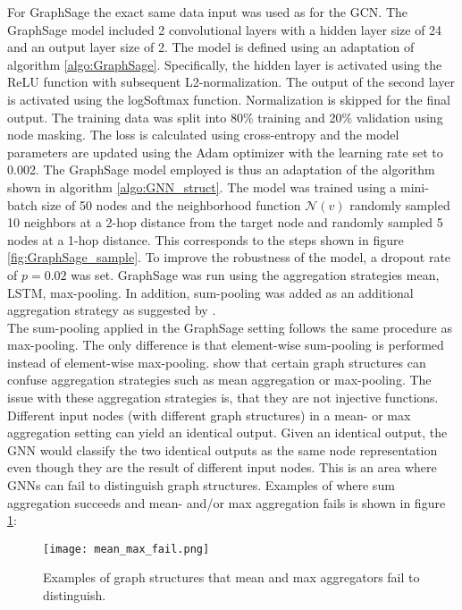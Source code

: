   For GraphSage the exact same data input was used as for the GCN. The 
  GraphSage model included 2 convolutional layers with a hidden layer size of
  24 and an output layer size of 2. The model is defined using an adaptation of 
  algorithm \ref{algo:GraphSage}. Specifically, the hidden layer is activated 
  using the ReLU function with subsequent L2-normalization. The output of the 
  second layer is activated using the logSoftmax function. Normalization is 
  skipped for the final output. The training data was split into 80\% training 
  and 20\% validation using node masking. The loss is calculated using 
  cross-entropy and the model parameters are updated using the Adam optimizer 
  with the learning rate set to 0.002. The GraphSage model employed is thus an
  adaptation of the algorithm shown in algorithm \ref{algo:GNN_struct}. The 
  model was trained using a mini-batch size of 50 nodes and the neighborhood 
  function $\mathcal{N}(v)$ randomly sampled 10 neighbors at a 2-hop distance
  from the target node and randomly sampled 5 nodes at a 1-hop distance. This 
  corresponds to the steps shown in figure \ref{fig:GraphSage_sample}. To 
  improve the robustness of the model, a dropout rate of $p = 0.02$ was set. 
  GraphSage was run using the aggregation strategies mean, LSTM, max-pooling. 
  In addition, sum-pooling was added as an additional aggregation strategy 
  as suggested by \cite{xu2018powerful}. \\

  \noindent The sum-pooling applied in the GraphSage setting follows 
  the same procedure as max-pooling. The only difference is that element-wise 
  sum-pooling is performed instead of element-wise max-pooling. 
  \cite{xu2018powerful} show that certain graph structures can confuse 
  aggregation strategies such as mean aggregation or max-pooling. The issue with 
  these aggregation strategies is, that they are not injective functions. 
  Different input nodes (with different graph structures) in a mean- or 
  max aggregation setting can yield an identical output. Given an 
  identical output, the GNN would classify the two identical outputs as the 
  same node representation even though they are the result of different input 
  nodes. This is an area where GNNs can fail to distinguish graph structures. 
  Examples of where sum aggregation succeeds and mean- and/or max aggregation 
  fails is shown in figure \ref{fig:graph_structures}:

  \begin{figure}[h]
		\centering
		\texttt{[image: mean\_max\_fail.png]}
		\caption{Examples of graph structures that mean and max aggregators 
        fail to distinguish.}
        \label{fig:graph_structures}
        \cite[p. 6]{xu2018powerful}
  \end{figure}

